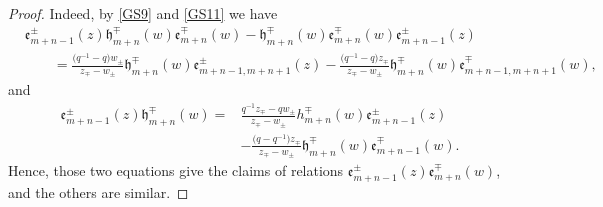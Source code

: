 \documentclass[10pt,a4paper]{amsart}
\numberwithin{equation}{section}
\begin{document}
\begin{proof}
Indeed, by \eqref{GS9} and \eqref{GS11} we have
\begin{align*}
 &\mathfrak{e}_{m+n-1}^{\pm}(z)\mathfrak{h}_{m+n}^{\mp}(w)\mathfrak{e}_{m+n}^{\mp}(w)-\mathfrak{h}_{m+n}^{\mp}(w)\mathfrak{e}_{m+n}^{\mp}(w)\mathfrak{e}_{m+n-1}^{\pm}(z)\\
&\qquad=\frac{\bigl(q^{-1}-q\bigr)w_{\pm}}{z_{\mp}-w_{\pm}}\mathfrak{h}_{m+n}^{\mp}(w)\mathfrak{e}_{m+n-1,m+n+1}^{\pm}(z)
-\frac{\bigl(q^{-1}-q\bigr)z_{\mp}}{z_{\mp}-w_{\pm}}\mathfrak{h}_{m+n}^{\mp}(w)\mathfrak{e}_{m+n-1,m+n+1}^{\mp}(w),
\end{align*}and
\begin{align*}
 \mathfrak{e}_{m+n-1}^{\pm}(z)\mathfrak{h}_{m+n}^{\mp}(w)={}&\frac{q^{-1}z_{\mp}-qw_{\pm}}{z_{\mp}-w_{\pm}}\mathfrak{}h_{m+n}^{\mp}(w)\mathfrak{e}_{m+n-1}^{\pm}(z)\\
&-\frac{\bigl(q-q^{-1}\bigr)z_{\mp}}{z_{\mp}-w_{\pm}}\mathfrak{h}_{m+n}^{\mp}(w)\mathfrak{e}_{m+n-1}^{\mp}(w).
\end{align*}
Hence, those two equations give the claims of relations $\mathfrak{e}_{m+n-1}^{\pm}(z)\mathfrak{e}_{m+n}^{\mp}(w)$, and the others are similar.
\end{proof}
\end{document}
